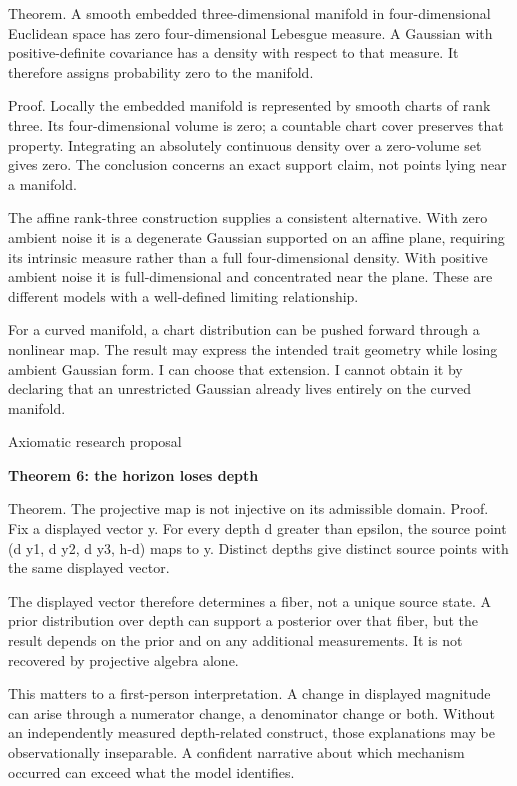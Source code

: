 \documentclass[10pt]{article}
\begin{document}
Theorem. A smooth embedded three-dimensional manifold in four-dimensional Euclidean space has zero four-dimensional Lebesgue measure. A Gaussian with positive-definite covariance has a density with respect to that measure. It therefore assigns probability zero to the manifold.\par
Proof. Locally the embedded manifold is represented by smooth charts of rank three. Its four-dimensional volume is zero; a countable chart cover preserves that property. Integrating an absolutely continuous density over a zero-volume set gives zero. The conclusion concerns an exact support claim, not points lying near a manifold.\par
The affine rank-three construction supplies a consistent alternative. With zero ambient noise it is a degenerate Gaussian supported on an affine plane, requiring its intrinsic measure rather than a full four-dimensional density. With positive ambient noise it is full-dimensional and concentrated near the plane. These are different models with a well-defined limiting relationship.\par
For a curved manifold, a chart distribution can be pushed forward through a nonlinear map. The result may express the intended trait geometry while losing ambient Gaussian form. I can choose that extension. I cannot obtain it by declaring that an unrestricted Gaussian already lives entirely on the curved manifold.\par
\clearpage
{\small\color{accent}Axiomatic research proposal}\par
{\LARGE\bfseries\color{ink}Theorem 6: the horizon loses depth}\par\vspace{7pt}
Theorem. The projective map is not injective on its admissible domain. Proof. Fix a displayed vector y. For every depth d greater than epsilon, the source point (d y1, d y2, d y3, h-d) maps to y. Distinct depths give distinct source points with the same displayed vector.\par
The displayed vector therefore determines a fiber, not a unique source state. A prior distribution over depth can support a posterior over that fiber, but the result depends on the prior and on any additional measurements. It is not recovered by projective algebra alone.\par
This matters to a first-person interpretation. A change in displayed magnitude can arise through a numerator change, a denominator change or both. Without an independently measured depth-related construct, those explanations may be observationally inseparable. A confident narrative about which mechanism occurred can exceed what the model identifies.\par
\end{document}

